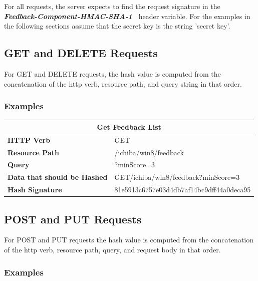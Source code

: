 For all requests, the server expects to find the request signature in the \\
\textbf{\textit{Feedback-Component-HMAC-SHA-1~}}
header variable. For the examples in the following sections assume that the
secret key is the string 'secret key'.

\subsection{GET and DELETE Requests}

For GET and DELETE requests, the hash value is computed from the concatenation
of the http verb, resource path, and query string in that order.
\subsubsection{Examples}

\begin{center}
\begin{tabular}{|l||l|}

\hline
\multicolumn{2}{|c|}{\textbf{Get Feedback List}} \\
\hline
\textbf{HTTP Verb}                  & GET \\
\hline
\textbf{Resource Path}              & /ichiba/win8/feedback \\
\hline
\textbf{Query}                      & ?minScore=3 \\
\hline
\textbf{Data that should be Hashed} & GET/ichiba/win8/feedback?minScore=3 \\
\hline
\textbf{Hash Signature}             & 81e5913c6757e03d4db7af14bc9dff44a0deca95 \\
\hline

\end{tabular}
\end{center}

\subsection{POST and PUT Requests}
For POST and PUT requests the hash value is computed from the concatenation
of the http verb, resource path, query, and request body in that order.

\subsubsection{Examples}

